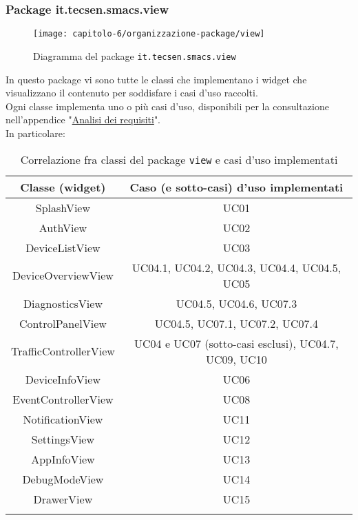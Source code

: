 \subsubsection{Package it.tecsen.smacs.view}
\label{subsubsec:it-tecsen-smacs-view}

\begin{figure}[!h]
  \centering 
  \texttt{[image: capitolo-6/organizzazione-package/view]} 
  \caption{Diagramma del package \texttt{it.tecsen.smacs.view}}
\end{figure}
In questo package vi sono tutte le classi che implementano i widget che visualizzano il contenuto per soddisfare i casi d'uso raccolti.\\
Ogni classe implementa uno o più casi d'uso, disponibili per la consultazione nell'appendice "\hyperref[cap:analisi-dei-requisiti]{Analisi dei requisiti}".\\
In particolare:
{
\renewcommand{\arraystretch}{1.5}
\begin{longtable}{|c|c|}
    \hline
    \textbf{Classe (widget)} & \textbf{Caso (e sotto-casi) d'uso implementati} \\\hline
    \endhead
    SplashView & UC01\\\hline
    AuthView & UC02 \\\hline
    DeviceListView & UC03 \\\hline
    DeviceOverviewView & UC04.1, UC04.2, UC04.3, UC04.4, UC04.5, UC05 \\\hline
    DiagnosticsView & UC04.5, UC04.6, UC07.3 \\\hline
    ControlPanelView & UC04.5, UC07.1, UC07.2, UC07.4 \\\hline
    TrafficControllerView & UC04 e UC07 (sotto-casi esclusi), UC04.7, UC09, UC10 \\\hline
    DeviceInfoView & UC06 \\\hline
    EventControllerView & UC08 \\\hline
    NotificationView & UC11 \\\hline
    SettingsView & UC12 \\\hline
    AppInfoView & UC13 \\\hline
    DebugModeView & UC14 \\\hline
    DrawerView & UC15 \\\hline
    \caption{Correlazione fra classi del package \texttt{view} e casi d'uso implementati}
\end{longtable}
}